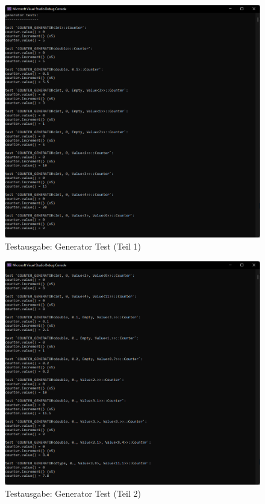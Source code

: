 \documentclass[german,notitlepage,smartquotes]{hgbreport}
\begin{document}
\begin{figure}[h]
\centering
\includegraphics[width=.95\textwidth]{03_generator_test}
\caption{Testausgabe: Generator Test (Teil 1)}
\label{fig:03_generator_test}
\end{figure}

\begin{figure}[h]
\centering
\includegraphics[width=.95\textwidth]{04_generator_test}
\caption{Testausgabe: Generator Test (Teil 2)}
\label{fig:04_generator_test}
\end{figure}
\end{document}
